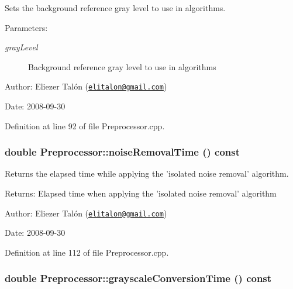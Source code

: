 Sets the background reference gray level to use in algorithms. 

\begin{Desc}
\item[Parameters:]
\begin{description}
\item[{\em grayLevel}]Background reference gray level to use in algorithms\end{description}
\end{Desc}
\begin{Desc}
\item[Author:]Eliezer Talón (\href{mailto:elitalon@gmail.com}{\tt elitalon@gmail.com}) \end{Desc}
\begin{Desc}
\item[Date:]2008-09-30 \end{Desc}


Definition at line 92 of file Preprocessor.cpp.\hypertarget{class_preprocessor_0cccd23820430541f18f2b24dbfd0784}{
\subsubsection[noiseRemovalTime]{\setlength{\rightskip}{0pt plus 5cm}double Preprocessor::noiseRemovalTime () const}}
\label{class_preprocessor_0cccd23820430541f18f2b24dbfd0784}


Returns the elapsed time while applying the 'isolated noise removal' algorithm. 

\begin{Desc}
\item[Returns:]Elapsed time when applying the 'isolated noise removal' algorithm\end{Desc}
\begin{Desc}
\item[Author:]Eliezer Talón (\href{mailto:elitalon@gmail.com}{\tt elitalon@gmail.com}) \end{Desc}
\begin{Desc}
\item[Date:]2008-09-30 \end{Desc}


Definition at line 112 of file Preprocessor.cpp.\hypertarget{class_preprocessor_7afe140bf2697393170fb8e2ccb818d5}{
\subsubsection[grayscaleConversionTime]{\setlength{\rightskip}{0pt plus 5cm}double Preprocessor::grayscaleConversionTime () const}}
\label{class_preprocessor_7afe140bf2697393170fb8e2ccb818d5}


